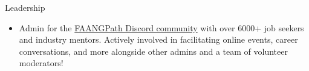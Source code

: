 \documentclass{resume} %
\begin{document}
\begin{rSection}{Leadership} 
\begin{itemize}
    \item Admin for the \href{https://discord.com/invite/WWbjEaZ}{FAANGPath Discord community} with over 6000+ job seekers and industry mentors. Actively involved in facilitating online events, career conversations, and more alongside other admins and a team of volunteer moderators! 
\end{itemize}

\end{rSection}
\end{document}
